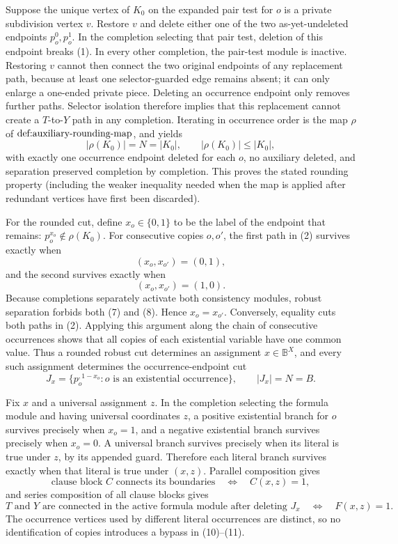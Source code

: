Suppose the unique vertex of \(K_0\) on the expanded pair test for \(o\) is a private subdivision vertex \(v\).  Restore \(v\) and delete either one of the two as-yet-undeleted endpoints \(p_o^0,p_o^1\).  In the completion selecting that pair test, deletion of this endpoint breaks (1).  In every other completion, the pair-test module is inactive.  Restoring \(v\) cannot then connect the two original endpoints of any replacement path, because at least one selector-guarded edge remains absent; it can only enlarge a one-ended private piece.  Deleting an occurrence endpoint only removes further paths.  Selector isolation therefore implies that this replacement cannot create a \(T\)-to-\(Y\) path in any completion.  Iterating in occurrence order is the map \(\rho\) of \(\textnormal{def:auxiliary-rounding-map}\), and yields
\[
|\rho(K_0)|=N=|K_0|, \qquad
|\rho(K_0)|\le |K_0|, \tag{6}
\]
with exactly one occurrence endpoint deleted for each \(o\), no auxiliary deleted, and separation preserved completion by completion.  This proves the stated rounding property (including the weaker inequality needed when the map is applied after redundant vertices have first been discarded).

For the rounded cut, define \(x_o\in\{0,1\}\) to be the label of the endpoint that remains: \(p_o^{x_o}\notin\rho(K_0)\).  For consecutive copies \(o,o'\), the first path in (2) survives exactly when
\[
(x_o,x_{o'})=(0,1), \tag{7}
\]
and the second survives exactly when
\[
(x_o,x_{o'})=(1,0). \tag{8}
\]
Because completions separately activate both consistency modules, robust separation forbids both (7) and (8).  Hence \(x_o=x_{o'}\).  Conversely, equality cuts both paths in (2).  Applying this argument along the chain of consecutive occurrences shows that all copies of each existential variable have one common value.  Thus a rounded robust cut determines an assignment \(x\in\mathbb B^X\), and every such assignment determines the occurrence-endpoint cut
\[
J_x=\{p_o^{,1-x_o}:o\text{ is an existential occurrence}\},
\qquad |J_x|=N=B. \tag{9}
\]

Fix \(x\) and a universal assignment \(z\).  In the completion selecting the formula module and having universal coordinates \(z\), a positive existential branch for \(o\) survives precisely when \(x_o=1\), and a negative existential branch survives precisely when \(x_o=0\).  A universal branch survives precisely when its literal is true under \(z\), by its appended guard.  Therefore each literal branch survives exactly when that literal is true under \((x,z)\).  Parallel composition gives
\[
\text{clause block }C\text{ connects its boundaries}
\quad\Longleftrightarrow\quad C(x,z)=1, \tag{10}
\]
and series composition of all clause blocks gives
\[
T\text{ and }Y\text{ are connected in the active formula module after deleting }J_x
\quad\Longleftrightarrow\quad F(x,z)=1. \tag{11}
\]
The occurrence vertices used by different literal occurrences are distinct, so no identification of copies introduces a bypass in (10)--(11).


